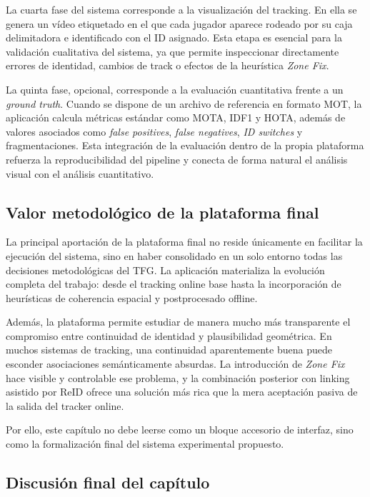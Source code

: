 \documentclass[../MAIN.tex]{subfiles}
\begin{document}
	La cuarta fase del sistema corresponde a la visualización del tracking. En ella se genera un vídeo etiquetado en el que cada jugador aparece rodeado por su caja delimitadora e identificado con el ID asignado. Esta etapa es esencial para la validación cualitativa del sistema, ya que permite inspeccionar directamente errores de identidad, cambios de track o efectos de la heurística \textit{Zone Fix}.
	
	La quinta fase, opcional, corresponde a la evaluación cuantitativa frente a un \textit{ground truth}. Cuando se dispone de un archivo de referencia en formato MOT, la aplicación calcula métricas estándar como MOTA, IDF1 y HOTA, además de valores asociados como \textit{false positives}, \textit{false negatives}, \textit{ID switches} y fragmentaciones. Esta integración de la evaluación dentro de la propia plataforma refuerza la reproducibilidad del pipeline y conecta de forma natural el análisis visual con el análisis cuantitativo.
	
	\subsection{Valor metodológico de la plataforma final}
	
	La principal aportación de la plataforma final no reside únicamente en facilitar la ejecución del sistema, sino en haber consolidado en un solo entorno todas las decisiones metodológicas del TFG. La aplicación materializa la evolución completa del trabajo: desde el tracking online base hasta la incorporación de heurísticas de coherencia espacial y postprocesado offline.
	
	Además, la plataforma permite estudiar de manera mucho más transparente el compromiso entre continuidad de identidad y plausibilidad geométrica. En muchos sistemas de tracking, una continuidad aparentemente buena puede esconder asociaciones semánticamente absurdas. La introducción de \textit{Zone Fix} hace visible y controlable ese problema, y la combinación posterior con linking asistido por ReID ofrece una solución más rica que la mera aceptación pasiva de la salida del tracker online.
	
	Por ello, este capítulo no debe leerse como un bloque accesorio de interfaz, sino como la formalización final del sistema experimental propuesto.
	
	\subsection{Discusión final del capítulo}
	
\end{document}
